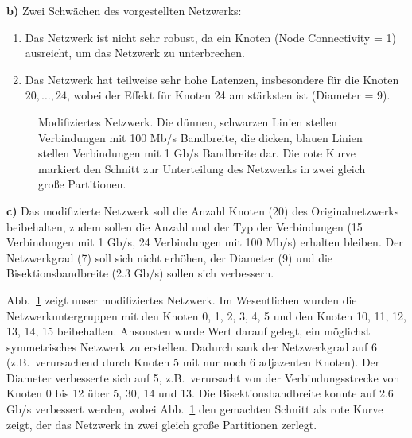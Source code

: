 \textbf{b)} Zwei Schwächen des vorgestellten Netzwerks:
\begin{enumerate}
 \item Das Netzwerk ist nicht sehr robust, da ein Knoten (Node Connectivity = 1) ausreicht, um das Netzwerk zu unterbrechen.
 \item Das Netzwerk hat teilweise sehr hohe Latenzen, insbesondere für die Knoten $20,\dots,24$, wobei der Effekt für Knoten 24 am stärksten ist (Diameter = 9). 
\end{enumerate}

\begin{figure}[tb]
 \centering 
 
 \caption{Modifiziertes Netzwerk. Die dünnen, schwarzen Linien stellen Verbindungen mit 100 Mb/s Bandbreite, die dicken, blauen Linien stellen Verbindungen mit 1 Gb/s Bandbreite dar. Die rote Kurve markiert den Schnitt zur Unterteilung des Netzwerks in zwei gleich große Partitionen.}
 \label{fig:eigenesNetzwerk}
\end{figure}

\textbf{c)} Das modifizierte Netzwerk soll die Anzahl Knoten (20) des Originalnetzwerks beibehalten, zudem sollen die Anzahl und der Typ der Verbindungen (15 Verbindungen mit 1 Gb/s, 24 Verbindungen mit 100 Mb/s) erhalten bleiben. Der Netzwerkgrad (7) soll sich nicht erhöhen, der Diameter (9) und die Bisektionsbandbreite (2.3 Gb/s) sollen sich verbessern.

Abb.~\ref{fig:eigenesNetzwerk} zeigt unser modifiziertes Netzwerk. Im Wesentlichen wurden die Netzwerkuntergruppen mit den Knoten 0, 1, 2, 3, 4, 5 und den Knoten 10, 11, 12, 13, 14, 15 beibehalten. Ansonsten wurde Wert darauf gelegt, ein möglichst symmetrisches Netzwerk zu erstellen. Dadurch sank der Netzwerkgrad auf 6 (z.B.~verursachend durch Knoten 5 mit nur noch 6 adjazenten Knoten). Der Diameter verbesserte sich auf 5, z.B.~verursacht von der Verbindungsstrecke von Knoten 0 bis 12 über 5, 30, 14 und 13. Die Bisektionsbandbreite konnte auf 2.6 Gb/s verbessert werden, wobei Abb.~\ref{fig:eigenesNetzwerk} den gemachten Schnitt als rote Kurve zeigt, der das Netzwerk in zwei gleich große Partitionen zerlegt.